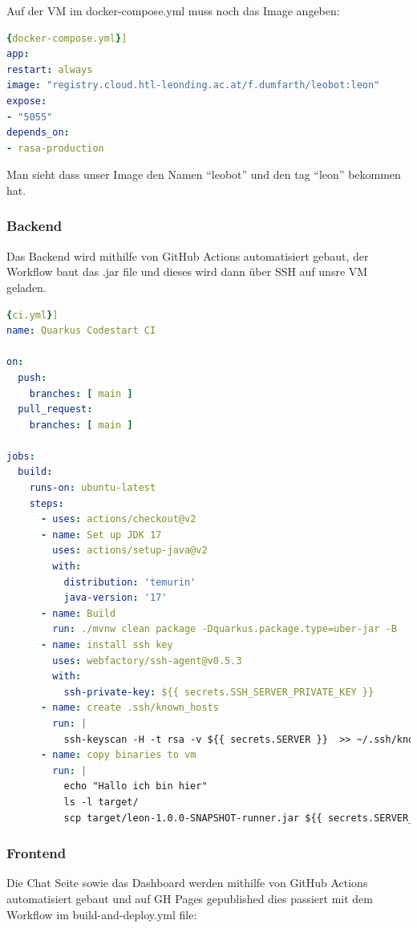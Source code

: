 Auf der VM im docker-compose.yml muss noch das Image angeben:
\begin{lstlisting}[language=yaml,label={lst:dockercomposeyml},caption={docker-compose.yml}]{docker-compose.yml}]
app:
restart: always
image: "registry.cloud.htl-leonding.ac.at/f.dumfarth/leobot:leon"
expose:
- "5055"
depends_on:
- rasa-production
\end{lstlisting}

Man sieht dass unser Image den Namen ``leobot'' und den tag ``leon'' bekommen hat.

\subsubsection{Backend}
Das Backend wird mithilfe von GitHub Actions automatisiert gebaut, der Workflow baut das .jar file und dieses wird dann über SSH auf unsre VM geladen.

\begin{lstlisting}[language=yaml,label={lst:ciyml},caption={ci.yml}]{ci.yml}]
name: Quarkus Codestart CI

on:
  push:
    branches: [ main ]
  pull_request:
    branches: [ main ]

jobs:
  build:
    runs-on: ubuntu-latest
    steps:
      - uses: actions/checkout@v2
      - name: Set up JDK 17
        uses: actions/setup-java@v2
        with:
          distribution: 'temurin'
          java-version: '17'
      - name: Build
        run: ./mvnw clean package -Dquarkus.package.type=uber-jar -B
      - name: install ssh key
        uses: webfactory/ssh-agent@v0.5.3
        with:
          ssh-private-key: ${{ secrets.SSH_SERVER_PRIVATE_KEY }}
      - name: create .ssh/known_hosts
        run: |
          ssh-keyscan -H -t rsa -v ${{ secrets.SERVER }}  >> ~/.ssh/known_hosts
      - name: copy binaries to vm
        run: |
          echo "Hallo ich bin hier"
          ls -l target/
          scp target/leon-1.0.0-SNAPSHOT-runner.jar ${{ secrets.SERVER_USER }}@${{ secrets.SERVER }}:
\end{lstlisting}

\subsubsection{Frontend}
Die Chat Seite sowie das Dashboard werden mithilfe von GitHub Actions automatisiert gebaut und auf GH Pages gepublished dies passiert mit dem Workflow im build-and-deploy.yml file:

